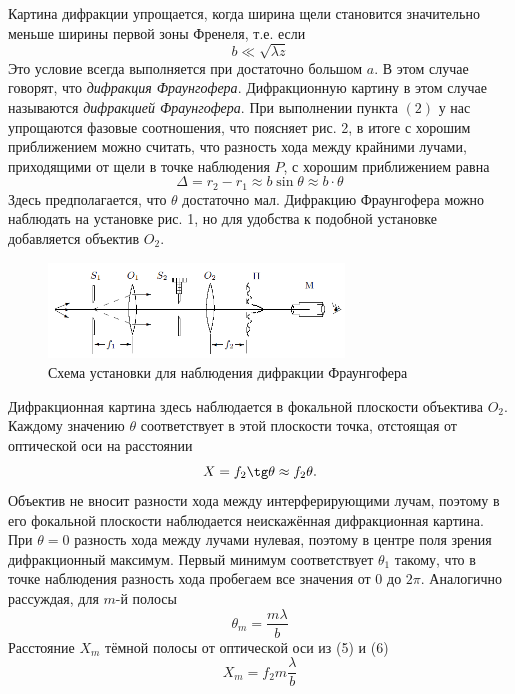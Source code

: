 \documentclass[a4paper, 12pt]{article}
\begin{document}
	Картина дифракции упрощается, когда ширина щели становится значительно меньше ширины первой зоны Френеля, т.е. если
	\begin{equation}
	b \ll\sqrt{\lambda z}
	\end{equation}
	Это условие всегда выполняется при достаточно большом $a$. В этом случае говорят, что \textit{дифракция Фраунгофера}. Дифракционную картину в этом случае называются \textit{дифракцией Фраунгофера}. При выполнении пункта $(2)$ у нас упрощаются фазовые соотношения, что поясняет рис. 2, в итоге с хорошим приближением можно считать, что разность хода между крайними лучами, приходящими от щели в точке наблюдения $P$, с хорошим приближением равна
	\begin{equation}
	\Delta = r_2 - r_1 \approx b \sin \theta \approx b \cdot \theta
	\end{equation}
	Здесь предполагается, что $\theta$ достаточно мал.
	Дифракцию Фраунгофера можно наблюдать на установке рис. 1, но для удобства к подобной установке добавляется объектив $O_2$.

	\begin{figure}[h]
		\includegraphics[width = 0.7\textwidth]{431-4.png}
		\centering
		\caption{Схема установки для наблюдения дифракции Фраунгофера}
		\label{Установка_Фраунгофер}
	\end{figure}
	Дифракционная картина здесь наблюдается в фокальной плоскости объектива $O_2$. Каждому значению $\theta$ соответствует в этой плоскости точка, отстоящая от оптической оси на расстоянии
	\begin{equation}
	X = f_2 \tg \theta \approx f_2 \theta.
	\end{equation}
	Объектив не вносит разности хода между интерферирующими лучам, поэтому в его фокальной плоскости наблюдается неискажённая дифракционная картина. При $\theta = 0$ разность хода между лучами нулевая, поэтому в центре поля зрения дифракционный максимум. Первый минимум соответствует $\theta_1$ такому, что в точке наблюдения разность хода пробегаем все значения от 0 до $2\pi$. Аналогично рассуждая, для $m$-й полосы
	\begin{equation}
	\theta_m = \frac{m \lambda}{b}
	\end{equation}
	Расстояние $X_m$ тёмной полосы от оптической оси из (5) и (6)
	\begin{equation}
		\label{Расстояние X_m}
	X_m = f_2m\frac{\lambda}{b}
	\end{equation}
\end{document}
